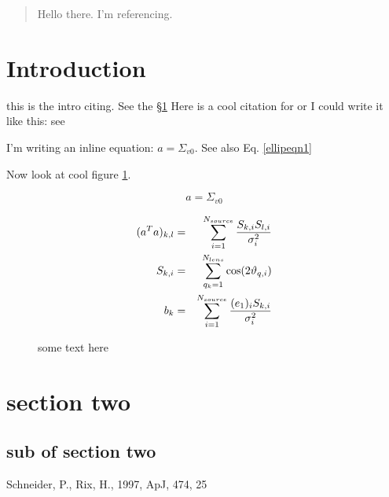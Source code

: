 \documentclass{aastex}
\begin{document}
\title{}

\author{Erin Scott Sheldon}


\begin{abstract}
Hello there. I'm referencing.
\end{abstract}

\keywords{}

\section{Introduction}\label{intro}
this is the intro citing.  See the  \S \ref{intro}  Here is
a cool citation for \citep{SR} or I could write it like this: see \cite{SR}

I'm writing an inline equation: $a = \Sigma_{v0}$.  See also Eq. \ref{ellipeqn1}

Now look at cool figure \ref{figurename}.

\begin{equation} \label{ellipeqn1}
a = \Sigma_{v0}
\end{equation}

\begin{eqnarray}
(a^{T}a)_{k,l} & = & {\sum_{i=1}^{N_{source}}{S_{k,i}S_{l,i} \over
\sigma_{i}^{2} } } \nonumber \\
S_{k,i} & = & {\sum_{q_k=1}^{N_{lens}}\cos(2\vartheta_{q,i})}  \\
b_k & = & \sum_{i=1}^{N_{source}}{(e_{1})_{i}S_{k,i} \over \sigma_{i}^{2}} \nonumber
\end{eqnarray}

\begin{figure}[t]
\caption{some text here} \label{figurename}
\end{figure}

\section{section two}
\subsection{sub of section two}

\acknowledgments


\begin{thebibliography}{}
 Schneider, P., Rix, H., 1997, ApJ, 474, 25
\end{thebibliography}
\end{document}
